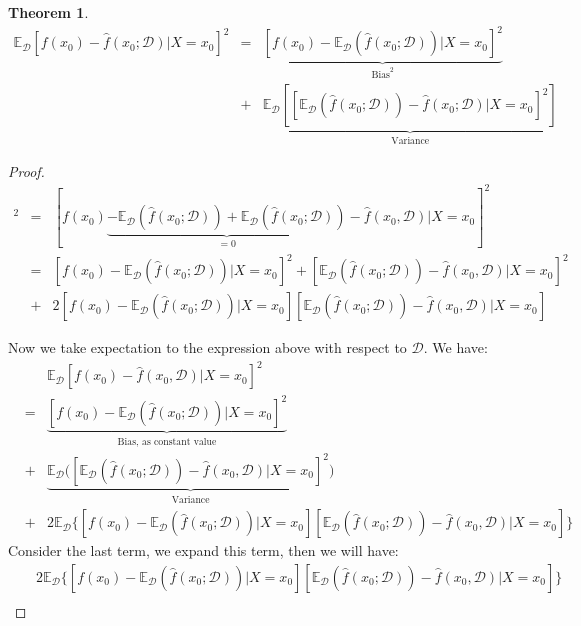 \documentclass{article}
\theoremstyle{MyNonumberplain}
\theoremstyle{break}
\newtheorem*{proof}{Proof. }
\newcommand{\ev}{\mathbb{E}}
\newcommand{\evd}{\ev_{\mathcal{D}}}
\theoremstyle{break}
\newtheorem{theorem}{Theorem}[section]
\begin{document}
\begin{thmbox}
    \begin{theorem}
        \begin{eqnarray*}
            \evd[f(x_0)-\hat{f}(x_0;\mathcal{D})|X=x_0]^2&=&\underbrace{[f(x_0)-\evd(\hat{f}(x_0;\mathcal{D}))|X=x_0]^2}_{\text{Bias}^2}\\
            &+&\underbrace{\evd[[\evd(\hat{f}(x_0;\mathcal{D}))-\hat{f}(x_0;\mathcal{D})|X=x_0]^2]}_{\text{Variance}}
        \end{eqnarray*}
    \end{theorem}
    \begin{prfbox}
        \begin{proof}
            \begin{eqnarray*}
                [f(x_0)-\hat{f}(x_0,\mathcal{D})|X=x_0]^2 & = & [f(x_0)\underbrace{-\evd(\hat{f}(x_0;\mathcal{D}))+\evd(\hat{f}(x_0;\mathcal{D}))}_{=0}-\hat{f}(x_0,\mathcal{D})|X=x_0]^2\\
                &=& [f(x_0)-\evd(\hat{f}(x_0;\mathcal{D}))|X=x_0]^2 + [\evd(\hat{f}(x_0;\mathcal{D}))-\hat{f}(x_0,\mathcal{D})|X=x_0]^2\\
                &+& 2[f(x_0)-\evd(\hat{f}(x_0;\mathcal{D}))|X=x_0][\evd(\hat{f}(x_0;\mathcal{D}))-\hat{f}(x_0,\mathcal{D})|X=x_0]
            \end{eqnarray*}

            Now we take expectation to the expression above with respect to $\mathcal{D}$. We have:
            \begin{eqnarray*}
                &   &\evd[f(x_0)-\hat{f}(x_0,\mathcal{D})|X=x_0]^2\\
                & = & \underbrace{[f(x_0)-\evd(\hat{f}(x_0;\mathcal{D}))|X=x_0]^2}_{\text{Bias, as constant value}}\\
                & + & \underbrace{\evd\biggl([\evd(\hat{f}(x_0;\mathcal{D}))-\hat{f}(x_0,\mathcal{D})|X=x_0]^2\biggr)}_{\text{Variance}}\\
                & + & 2 \evd \biggl\{[f(x_0)-\evd(\hat{f}(x_0;\mathcal{D}))|X=x_0][\evd(\hat{f}(x_0;\mathcal{D}))-\hat{f}(x_0,\mathcal{D})|X=x_0]\biggr\}
            \end{eqnarray*}
            Consider the last term, we expand this term, then we will have: 
                \begin{eqnarray*}
                    && 2 \evd \biggl\{[f(x_0)-\evd(\hat{f}(x_0;\mathcal{D}))|X=x_0][\evd(\hat{f}(x_0;\mathcal{D}))-\hat{f}(x_0,\mathcal{D})|X=x_0]\biggr\} \\
                \end{eqnarray*}
        \end{proof}
    \end{prfbox}
\end{thmbox}
\end{document}
